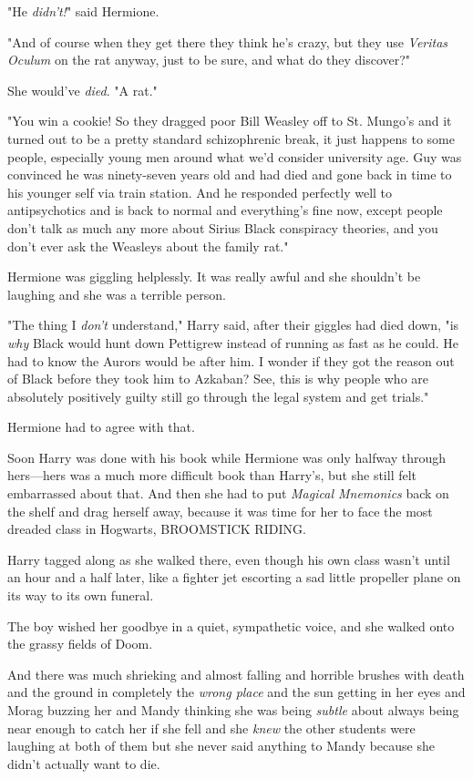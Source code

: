 "He \emph{didn't!}" said Hermione.

"And of course when they get there they think he's crazy, but they use
\emph{Veritas Oculum} on the rat anyway, just to be sure, and what do they
discover?"

She would've \emph{died}. "A rat."

"You win a cookie! So they dragged poor Bill Weasley off to St. Mungo's and it
turned out to be a pretty standard schizophrenic break, it just happens to some
people, especially young men around what we'd consider university age. Guy was
convinced he was ninety-seven years old and had died and gone back in time to
his younger self via train station. And he responded perfectly well to
antipsychotics and is back to normal and everything's fine now, except people
don't talk as much any more about Sirius Black conspiracy theories, and you
don't ever ask the Weasleys about the family rat."

Hermione was giggling helplessly. It was really awful and she shouldn't be
laughing and she was a terrible person.

"The thing I \emph{don't} understand," Harry said, after their giggles had died
down, "is \emph{why} Black would hunt down Pettigrew instead of running as fast
as he could. He had to know the Aurors would be after him. I wonder if they got
the reason out of Black before they took him to Azkaban? See, this is why
people who are absolutely positively guilty still go through the legal system
and get trials."

Hermione had to agree with that.

Soon Harry was done with his book while Hermione was only halfway through
hers---hers was a much more difficult book than Harry's, but she still felt
embarrassed about that. And then she had to put \emph{Magical Mnemonics} back
on the shelf and drag herself away, because it was time for her to face the
most dreaded class in Hogwarts, BROOMSTICK RIDING.

Harry tagged along as she walked there, even though his own class wasn't until
an hour and a half later, like a fighter jet escorting a sad little propeller
plane on its way to its own funeral.

The boy wished her goodbye in a quiet, sympathetic voice, and she walked onto
the grassy fields of Doom.

And there was much shrieking and almost falling and horrible brushes with death
and the ground in completely the \emph{wrong place} and the sun getting in her
eyes and Morag buzzing her and Mandy thinking she was being \emph{subtle} about
always being near enough to catch her if she fell and she \emph{knew} the other
students were laughing at both of them but she never said anything to Mandy
because she didn't actually want to die.

